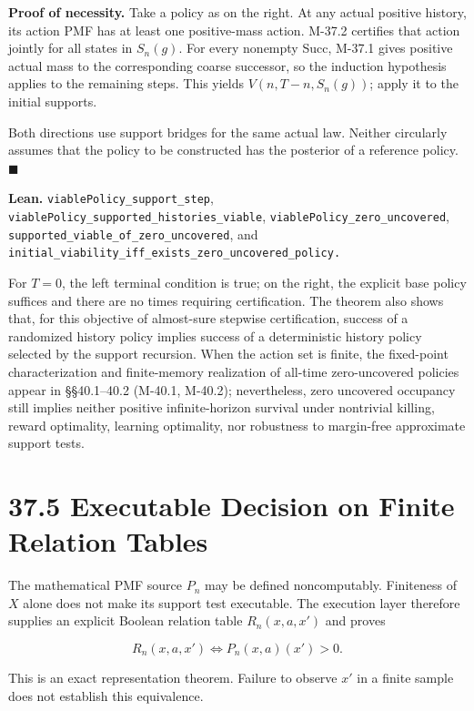 \documentclass[
  english,
  11pt,
  oneside]{book}
\newcounter{none} %
\begin{document}
\textbf{Proof of necessity.} Take a policy as on the right. At any actual positive history, its action PMF has at least one positive-mass action. M-37.2 certifies that action jointly for all states in \(S_n(g)\). For every nonempty Succ, M-37.1 gives positive actual mass to the corresponding coarse successor, so the induction hypothesis applies to the remaining steps. This yields \(V(n,T-n,S_n(g))\); apply it to the initial supports.

Both directions use support bridges for the same actual law. Neither circularly assumes that the policy to be constructed has the posterior of a reference policy. \(\blacksquare\)

\textbf{Lean.} \nolinkurl{viablePolicy_support_step}, \nolinkurl{viablePolicy_supported_histories_viable}, \nolinkurl{viablePolicy_zero_uncovered}, \nolinkurl{supported_viable_of_zero_uncovered}, and \nolinkurl{initial_viability_iff_exists_zero_uncovered_policy.}

For \(T=0\), the left terminal condition is true; on the right, the explicit base policy suffices and there are no times requiring certification. The theorem also shows that, for this objective of almost-sure stepwise certification, success of a randomized history policy implies success of a deterministic history policy selected by the support recursion. When the action set is finite, the fixed-point characterization and finite-memory realization of all-time zero-uncovered policies appear in §§40.1--40.2 (M-40.1, M-40.2); nevertheless, zero uncovered occupancy still implies neither positive infinite-horizon survival under nontrivial killing, reward optimality, learning optimality, nor robustness to margin-free approximate support tests.

\section{37.5 Executable Decision on Finite Relation Tables}\label{executable-decision-on-finite-relation-tables}

The mathematical PMF source \(P_n\) may be defined noncomputably. Finiteness of \(X\) alone does not make its support test executable. The execution layer therefore supplies an explicit Boolean relation table \(R_n(x,a,x')\) and proves

\[R_n(x,a,x')\iff P_n(x,a)(x')>0.\]

This is an exact representation theorem. Failure to observe \(x'\) in a finite sample does not establish this equivalence.
\end{document}

